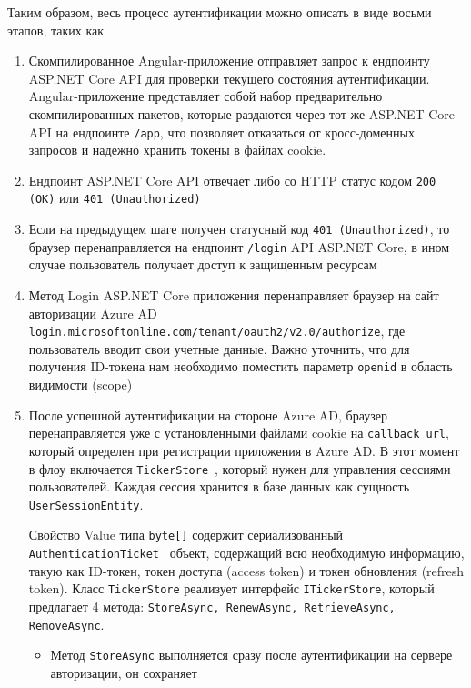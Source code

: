 Таким образом, весь процесс аутентификации можно описать в виде восьми этапов, таких как
\begin{enumerate}
    \item Скомпилированное Angular-приложение отправляет запрос к ендпоинту ASP.NET Core API для проверки текущего
    состояния аутентификации.
    Angular-приложение представляет собой набор предварительно скомпилированных пакетов, которые раздаются через
    тот же ASP.NET Core API на ендпоинте \texttt{/app}, что позволяет отказаться от кросс-доменных запросов и
    надежно хранить токены в файлах cookie.
    \item Ендпоинт ASP.NET Core API отвечает либо со HTTP статус кодом \texttt{200 (OK)} или \texttt{401 (Unauthorized)}
    \item Если на предыдущем шаге получен статусный код \texttt{401 (Unauthorized)}, то браузер перенаправляется
    на ендпоинт \texttt{/login} API ASP.NET Core, в ином случае пользователь получает доступ к защищенным ресурсам
    \item Метод Login ASP.NET Core приложения перенаправляет браузер на сайт авторизации
    Azure AD \texttt{login.microsoftonline.com/tenant/oauth2/v2.0/authorize}, где пользователь вводит свои учетные данные.
    Важно уточнить, что для получения ID-токена нам необходимо поместить параметр \texttt{openid} в область видимости (scope)
    
    \item После успешной аутентификации на стороне Azure AD, браузер перенаправляется уже с установленными
    файлами cookie на \texttt{callback\_url}, который определен при регистрации приложения в Azure AD\@.
    В этот момент в флоу включается \texttt{TickerStore}~\cite{microsoftIticketstore2023, ticketStore_2023},
    который нужен для управления сессиями пользователей.
    Каждая сессия хранится в базе данных как сущность \texttt{UserSessionEntity}.
    
    Свойство Value типа \texttt{byte[]} содержит сериализованный \texttt{AuthenticationTicket}~\cite{microsoftAuthenticationTicket2023}
    объект, содержащий всю необходимую информацию, такую как ID-токен,
    токен доступа (access token) и токен обновления (refresh token).
    Класс \texttt{TickerStore} реализует интерфейс \texttt{ITickerStore}, который предлагает 4 метода:
    \texttt{StoreAsync, RenewAsync, RetrieveAsync, RemoveAsync}.
    \begin{itemize}
        \item Метод \texttt{StoreAsync} выполняется сразу после аутентификации на сервере авторизации, он сохраняет

\end{itemize}
\end{enumerate}

